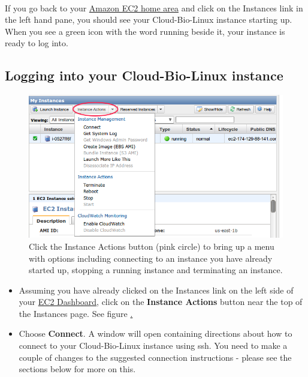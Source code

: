 \paragraph{}If you go back to your \href{http://console.aws.amazon.com/ec2/home}{Amazon EC2 home area} and click on the Instances link in the left hand pane, you should see your Cloud-Bio-Linux instance starting up. When you see a green icon with the word running beside it, your instance is ready to log into.

\subsection{Logging into your Cloud-Bio-Linux instance}


\begin{figure}[!hd]
\includegraphics[width=\maxwidth]{"images/instancesOptions"}
\caption[Start an Instance]{\label{fig:instancesOptions}Click the Instance Actions button (pink circle) to bring up a menu with options including connecting to an instance you have already started up, stopping a running instance and terminating an instance.}
\end{figure}


\begin{itemize}
\item Assuming you have already clicked on the Instances link on the left side of your \href{https://console.aws.amazon.com/ec2/home}{EC2 Dashboard}, click on the \textbf{Instance Actions} button near the top of the Instances page. See figure \href{fig:instancesOptions}.
\item Choose \textbf{Connect}. A window will open containing directions about how to connect to your Cloud-Bio-Linux instance using ssh. You need to make a couple of changes to the suggested connection instructions - please see the sections below for more on this.
\end{itemize}

